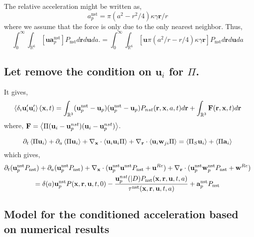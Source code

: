 The relative acceleration might be written as, 
\begin{equation*}
    a_p^\text{nst}
    = 
    \pi (a^2 - r^2/4) \kappa \gamma \textbf{r}/r
\end{equation*}
where we assume that the force is only due to the only nearest neighbor. 
Thus, 
\begin{equation*}
    \int_{0}^\infty
    \int_{\mathbb{R}^6} \left[
        \textbf{u} \textbf{a}^\text{nst}_p
    \right]P_\text{nst}
    d\textbf{r}
    d\textbf{u}
    da.
    = 
    \int_{0}^\infty
    \int_{\mathbb{R}^6} \left[
        \textbf{u} \pi (a^2/r - r/4) \kappa \gamma \textbf{r}
    \right]P_\text{nst}
    d\textbf{r}
    d\textbf{u}
    da
\end{equation*}


\subsection{Let remove the condition on $\textbf{u}_i$ for $\Pi$. }
It gives, 
\begin{equation*}
    \left<\delta_i \textbf{u}_i' \textbf{u}_i'\right>(\textbf{x},t)
    =  
    \int_{\mathbb{R}^3 }
    (\textbf{u}_p^\text{nst} -\textbf{u}_p)
    (\textbf{u}_p^\text{nst} - \textbf{u}_p)
    P_{nst}(\textbf{r},\textbf{x},a,t)
    d\textbf{r}
    + \int_{\mathbb{R}^3 }
    \textbf{F}(\textbf{r},\textbf{x},t)
    d\textbf{r}
\end{equation*}
where, $\textbf{F} = \left<\Pi (\textbf{u}_i - \textbf{u}_p^{nst})(\textbf{u}_i - \textbf{u}_p^{nst})\right>$. 

\begin{equation*}
    \partial_t \left<\Pi \textbf{u}_i\right>
    + \partial_a \left<\Pi  \textbf{u}_i\right>
    + {\mathbf{\nabla}_\textbf{x}}\cdot\left<\textbf{u}_i \textbf{u}_i  \Pi\right>
    + {\mathbf{\nabla}_\textbf{r}}\cdot \left< \textbf{u}_i \textbf{w}_{ji} \Pi\right>
    = 
    \left<\Pi_S \textbf{u}_i\right>
    + \left<\Pi \textbf{a}_i \right>
\end{equation*}
which gives, 
\begin{multline*}
    \partial_t (\textbf{u}_p^\text{nst} P_\text{nst})
    + \partial_a (\textbf{u}_p^\text{nst} P_\text{nst})
    + {\mathbf{\nabla}_\textbf{x}} \cdot  (\textbf{u}_p^\text{nst} \textbf{u}^\text{nst}  P_\text{nst} + \textbf{u}^{Re})
    + {\mathbf{\nabla}_\textbf{r}} \cdot  (\textbf{u}_p^\text{nst} \textbf{w}^\text{nst}_p P_\text{nst}+ \textbf{w}^{Re})\\
    = \delta(a)  \textbf{u}_p^\text{nst} P(\textbf{x},\textbf{r}, \textbf{u},t,0)
    - \frac{ \textbf{u}_p^{nst}(|D) P_\text{nst}(\textbf{x},\textbf{r},\textbf{u},t,a)}{\tau^\text{nst}(\textbf{x},\textbf{r},\textbf{u},t,a)}
    + \textbf{a}_p^\text{nst}
    P_\text{nst} 
\end{multline*}

\subsection*{Model for the conditioned acceleration based on numerical results}